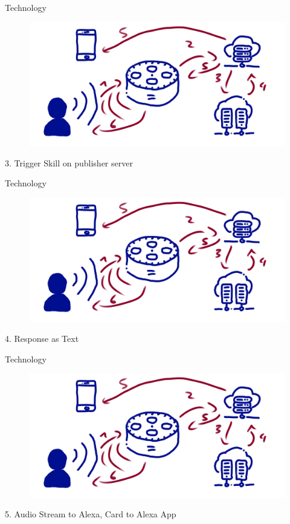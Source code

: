 \documentclass[aspectratio=169]{beamer}
\begin{document}
\begin{frame}{Technology}
\begin{figure}
	\includegraphics[width=0.9\linewidth]{images/alexatech}
\end{figure}
3. Trigger Skill on publisher server
\end{frame}

\begin{frame}{Technology}
\begin{figure}
	\includegraphics[width=0.9\linewidth]{images/alexatech}
\end{figure}
4. Response as Text
\end{frame}

\begin{frame}{Technology}
\begin{figure}
	\includegraphics[width=0.9\linewidth]{images/alexatech}
\end{figure}
5. Audio Stream to Alexa, Card to Alexa App
\end{frame}
\end{document}
